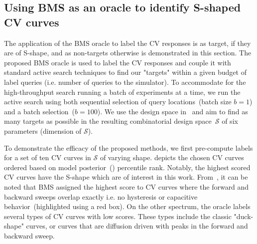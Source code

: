 \subsection{Using BMS as an oracle to identify S-shaped CV curves}
The application of the BMS oracle to label the CV responses is as target, if they are of S-shape, and as non-targets otherwise is demonstrated in this section. 
The proposed BMS oracle is used to label the CV responses and couple it with standard active search techniques to find our "targets" within a given budget of label queries (i.e. number of queries to the simulator). 
To accommodate for the high-throughput search running a batch of experiments at a time, we run the active search using both sequential selection of query locations~(batch size \(b=1\)) and a batch selection~(\(b=100\)). 
We use the  design space in~ and aim to find as many targets as possible in the resulting combinatorial design space~\(\mathcal{S}\) of six parameters (dimension of \(\mathcal{S}\)). 

To demonstrate the efficacy of the proposed methods, we first pre-compute labels for a set of ten CV curves in \(\mathcal{S}\) of varying shape.
 depicts the chosen CV curves ordered based on model posterior~() percentile rank.
Notably, the highest scored CV curves have the S-shape which are of interest in this work.
From~, it can be noted that BMS assigned the highest score to CV curves where the forward and backward sweeps overlap exactly i.e. no hysteresis or capacitive behavior~(highlighted using a red box). 
On the other spectrum, the oracle labels several types of CV curves with low scores. These types include the classic "duck-shape" curves, or curves that are diffusion driven with peaks in the forward and backward sweep.  

